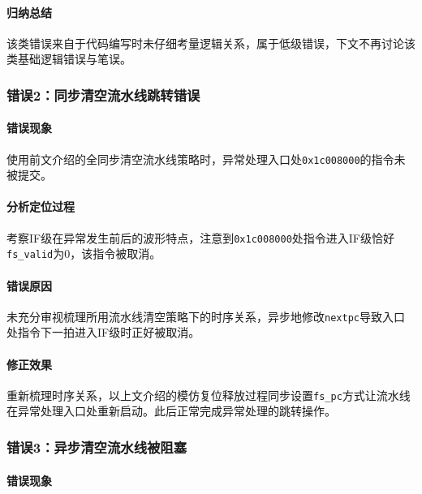 \documentclass[UTF-8,twoside,cs4size]{ctexart}
\begin{document}
    \paragraph{归纳总结}\hfill
    
    该类错误来自于代码编写时未仔细考量逻辑关系，属于低级错误，下文不再讨论该类基础逻辑错误与笔误。
    
    \subsubsection{错误\textbf{2：}同步清空流水线跳转错误}
    \paragraph{错误现象}\hfill
    
    使用前文介绍的全同步清空流水线策略时，异常处理入口处\texttt{0x1c008000}的指令未被提交。
    
    \paragraph{分析定位过程}\hfill
    
    考察IF级在异常发生前后的波形特点，注意到\texttt{0x1c008000}处指令进入IF级恰好\texttt{fs\_valid}为0，该指令被取消。
    
    \paragraph{错误原因}\hfill
    
    未充分审视梳理所用流水线清空策略下的时序关系，异步地修改\texttt{nextpc}导致入口处指令下一拍进入IF级时正好被取消。
    
    \paragraph{修正效果}\hfill
    
    重新梳理时序关系，以上文介绍的模仿复位释放过程同步设置\texttt{fs\_pc}方式让流水线在异常处理入口处重新启动。此后正常完成异常处理的跳转操作。
    
    \subsubsection{错误\textbf{3：}异步清空流水线被阻塞}
    \paragraph{错误现象}\hfill
    
\end{document}
